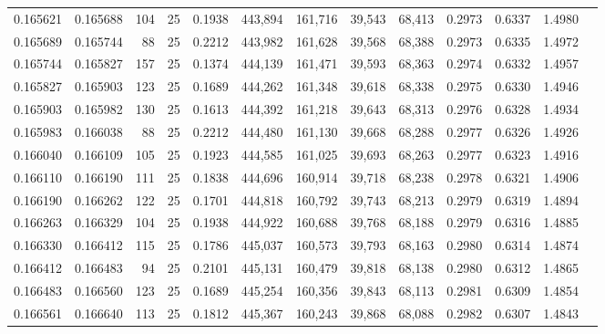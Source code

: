 \begin{tabular}{rrrrrrrrrrrrr}
0.165621 & 0.165688 &   104 &  25 &                                     0.1938 & 443,894 & 161,716 &  39,543 &  68,413 & 0.2973 & 0.6337 & 1.4980 \\
0.165689 & 0.165744 &    88 &  25 &                                     0.2212 & 443,982 & 161,628 &  39,568 &  68,388 & 0.2973 & 0.6335 & 1.4972 \\
0.165744 & 0.165827 &   157 &  25 &                                     0.1374 & 444,139 & 161,471 &  39,593 &  68,363 & 0.2974 & 0.6332 & 1.4957 \\
0.165827 & 0.165903 &   123 &  25 &                                     0.1689 & 444,262 & 161,348 &  39,618 &  68,338 & 0.2975 & 0.6330 & 1.4946 \\
0.165903 & 0.165982 &   130 &  25 &                                     0.1613 & 444,392 & 161,218 &  39,643 &  68,313 & 0.2976 & 0.6328 & 1.4934 \\
0.165983 & 0.166038 &    88 &  25 &                                     0.2212 & 444,480 & 161,130 &  39,668 &  68,288 & 0.2977 & 0.6326 & 1.4926 \\
0.166040 & 0.166109 &   105 &  25 &                                     0.1923 & 444,585 & 161,025 &  39,693 &  68,263 & 0.2977 & 0.6323 & 1.4916 \\
0.166110 & 0.166190 &   111 &  25 &                                     0.1838 & 444,696 & 160,914 &  39,718 &  68,238 & 0.2978 & 0.6321 & 1.4906 \\
0.166190 & 0.166262 &   122 &  25 &                                     0.1701 & 444,818 & 160,792 &  39,743 &  68,213 & 0.2979 & 0.6319 & 1.4894 \\
0.166263 & 0.166329 &   104 &  25 &                                     0.1938 & 444,922 & 160,688 &  39,768 &  68,188 & 0.2979 & 0.6316 & 1.4885 \\
0.166330 & 0.166412 &   115 &  25 &                                     0.1786 & 445,037 & 160,573 &  39,793 &  68,163 & 0.2980 & 0.6314 & 1.4874 \\
0.166412 & 0.166483 &    94 &  25 &                                     0.2101 & 445,131 & 160,479 &  39,818 &  68,138 & 0.2980 & 0.6312 & 1.4865 \\
0.166483 & 0.166560 &   123 &  25 &                                     0.1689 & 445,254 & 160,356 &  39,843 &  68,113 & 0.2981 & 0.6309 & 1.4854 \\
0.166561 & 0.166640 &   113 &  25 &                                     0.1812 & 445,367 & 160,243 &  39,868 &  68,088 & 0.2982 & 0.6307 & 1.4843 \\

\end{tabular}
